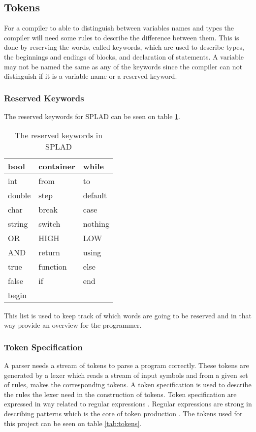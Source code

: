 \subsection{Tokens}
For a compiler to able to distinguish between variables names and types the compiler will need some rules to describe the difference between them. This is done by reserving the words, called keywords, which are used to describe types, the beginnings and endings of blocks, and declaration of statements. A variable may not be named the same as any of the keywords since the compiler can not distinguish if it is a variable name or a reserved keyword.

\subsubsection{Reserved Keywords}
The reserved keywords for SPLAD can be seen on table \ref{tab:keywords}.

\begin{table}[H]
	\begin{tabular}{|l|l|l|}
		\hline
		bool	&	container 	&	while	\\ \hline
		int 	&	from		&	to		\\ \hline
		double	&	step		&	default	\\ \hline
		char 	& 	break		&	case	\\ \hline
		string 	&	switch		&	nothing	\\ \hline
		OR	 	&	HIGH		&	LOW		\\ \hline
		AND 	&	return		& 	using	\\ \hline
		true 	&	function	&	else	\\ \hline
		false 	&	if			&	end		\\ \hline
		begin 	&	~			&	~		\\ \hline
	\end{tabular}
	\caption{The reserved keywords in SPLAD}
	\label{tab:keywords}
\end{table}

This list is used to keep track of which words are going to be reserved and in that way provide an overview for the programmer. 

\subsubsection{Token Specification}
A parser needs a stream of tokens to parse a program correctly. These tokens are generated by a lexer which reads a stream of input symbols and from a given set of rules, makes the corresponding tokens. A token specification is used to describe the rules the lexer need in the construction of tokens. Token specification are expressed in way related to regular expressions \citep{sebesta}. Regular expressions are strong in describing patterns which is the core of token production \citep{sipser}. The tokens used for this project can be seen on table \ref{tab:tokens}.

